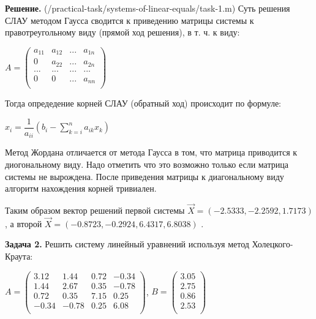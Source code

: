 \documentclass[a4paper, 12pt]{article}
\begin{document}
    \quad \textbf{Решение.} (/practical-task/systems-of-linear-equals/task-1.m) Суть решения СЛАУ методом Гаусса сводится к приведению матрицы системы к правотреугольному виду (прямой ход решения), в т. ч. к виду:
    
    \begin{center}
        $ A = \left(
            \begin{array}{cccc}
                a_{11} & a_{12} & ... & a_{1n} \\
                0 & a_{22} & ... & a_{2n} \\
                ... & ... & ... & ... \\
                0 & 0 & ... & a_{nn} \\    
            \end{array}
        \right)$
    \end{center}

    \quad Тогда опредедение корней СЛАУ (обратный ход) происходит по формуле: 

    \begin{center}
        $x_i = \dfrac{1}{a_{i i}} (b_i - \displaystyle\sum\limits_{k=i}^{n} a_{ik} x_k) $
    \end{center}

    \quad Метод Жордана отличается от метода Гаусса в том, что матрица приводится к диогональному виду. 
    Надо отметить что это возможно только если матрица системы не вырождена. После приведения матрицы к диагональному виду алгоритм нахождения корней тривиален.  

    \quad Таким образом вектор решений первой системы $\vec{X} = (-2.5333, -2.2592, 1.7173)$, а второй $\vec{X} = (-0.8723, -0.2924, 6.4317, 6.8038)$ .

    \quad \textbf{Задача 2.} Решить систему линейный уравнений используя метод Холецкого-Краута:

    \begin{center}
        $A = \left(
            \begin{array}{cccc}
                3.12 & 1.44 & 0.72 & -0.34 \\
                1.44 & 2.67 & 0.35 & -0.78 \\
                0.72 & 0.35 & 7.15 & 0.25 \\
                -0.34 & -0.78 & 0.25 & 6.08 \\
            \end{array}
        \right)$, $B = \left(
            \begin{array}{ccc}
                3.05 \\
                2.75 \\ 
                0.86 \\
                2.53 \\
            \end{array}
        \right)$
    \end{center}
\end{document}
